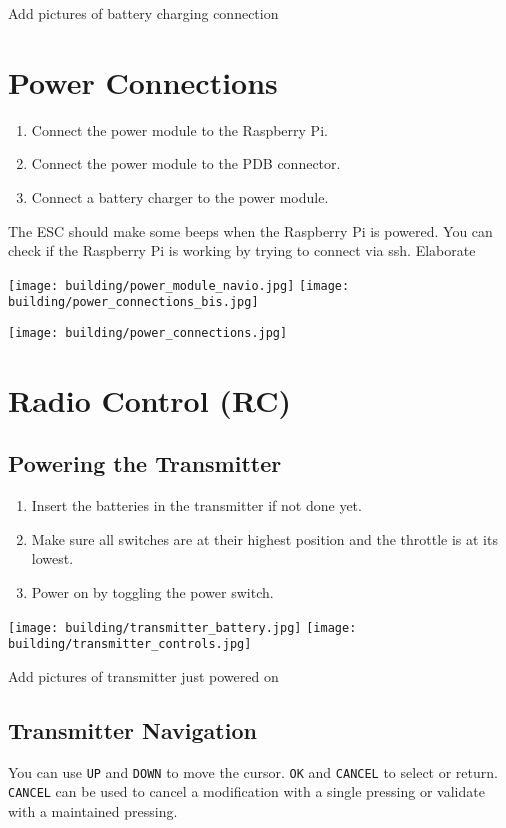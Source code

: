 {\color{blue} Add pictures of battery charging connection}

\section{Power Connections}
\begin{enumerate}
    \item Connect the power module to the Raspberry Pi.
    \item Connect the power module to the PDB connector.
    \item Connect a battery charger to the power module.
\end{enumerate}
The ESC should make some beeps when the Raspberry Pi is powered.
You can check if the Raspberry Pi is working by trying to connect via ssh.
{\color{orange} Elaborate}

\texttt{[image: building/power\_module\_navio.jpg]}
\texttt{[image: building/power\_connections\_bis.jpg]}

\texttt{[image: building/power\_connections.jpg]}

\section{Radio Control (RC)}
\subsection{Powering the Transmitter}
\begin{enumerate}
    \item Insert the batteries in the transmitter if not done yet.
    \item Make sure all switches are at their highest position and the throttle is at its lowest.
    \item Power on by toggling the power switch.
\end{enumerate}

\texttt{[image: building/transmitter\_battery.jpg]}
\texttt{[image: building/transmitter\_controls.jpg]}

{\color{blue} Add pictures of transmitter just powered on}

\subsection{Transmitter Navigation}
You can use \texttt{UP} and \texttt{DOWN} to move the cursor.
\texttt{OK} and \texttt{CANCEL} to select or return.
\texttt{CANCEL} can be used to cancel a modification with a single pressing or validate with a maintained pressing.

